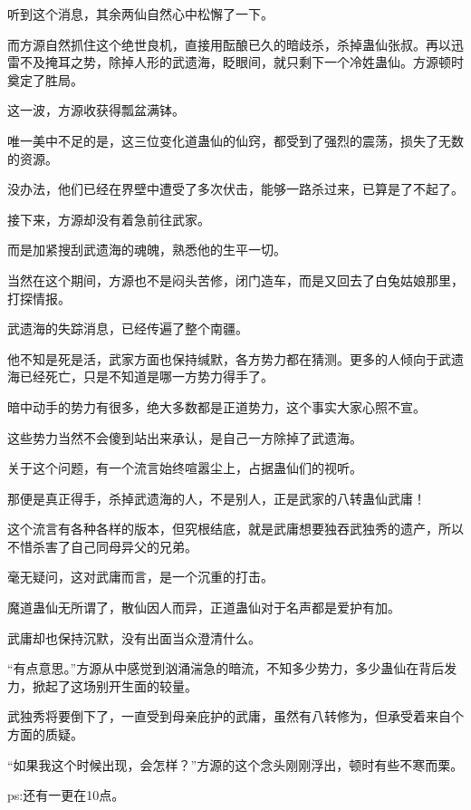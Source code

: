 \begin{this_body}
听到这个消息，其余两仙自然心中松懈了一下。

而方源自然抓住这个绝世良机，直接用酝酿已久的暗歧杀，杀掉蛊仙张叔。再以迅雷不及掩耳之势，除掉人形的武遗海，眨眼间，就只剩下一个冷姓蛊仙。方源顿时奠定了胜局。

这一波，方源收获得瓢盆满钵。

唯一美中不足的是，这三位变化道蛊仙的仙窍，都受到了强烈的震荡，损失了无数的资源。

没办法，他们已经在界壁中遭受了多次伏击，能够一路杀过来，已算是了不起了。

接下来，方源却没有着急前往武家。

而是加紧搜刮武遗海的魂魄，熟悉他的生平一切。

当然在这个期间，方源也不是闷头苦修，闭门造车，而是又回去了白兔姑娘那里，打探情报。

武遗海的失踪消息，已经传遍了整个南疆。

他不知是死是活，武家方面也保持缄默，各方势力都在猜测。更多的人倾向于武遗海已经死亡，只是不知道是哪一方势力得手了。

暗中动手的势力有很多，绝大多数都是正道势力，这个事实大家心照不宣。

这些势力当然不会傻到站出来承认，是自己一方除掉了武遗海。

关于这个问题，有一个流言始终喧嚣尘上，占据蛊仙们的视听。

那便是真正得手，杀掉武遗海的人，不是别人，正是武家的八转蛊仙武庸！

这个流言有各种各样的版本，但究根结底，就是武庸想要独吞武独秀的遗产，所以不惜杀害了自己同母异父的兄弟。

毫无疑问，这对武庸而言，是一个沉重的打击。

魔道蛊仙无所谓了，散仙因人而异，正道蛊仙对于名声都是爱护有加。

武庸却也保持沉默，没有出面当众澄清什么。

“有点意思。”方源从中感觉到汹涌湍急的暗流，不知多少势力，多少蛊仙在背后发力，掀起了这场别开生面的较量。

武独秀将要倒下了，一直受到母亲庇护的武庸，虽然有八转修为，但承受着来自个方面的质疑。

“如果我这个时候出现，会怎样？”方源的这个念头刚刚浮出，顿时有些不寒而栗。

ps:还有一更在10点。

\end{this_body}

